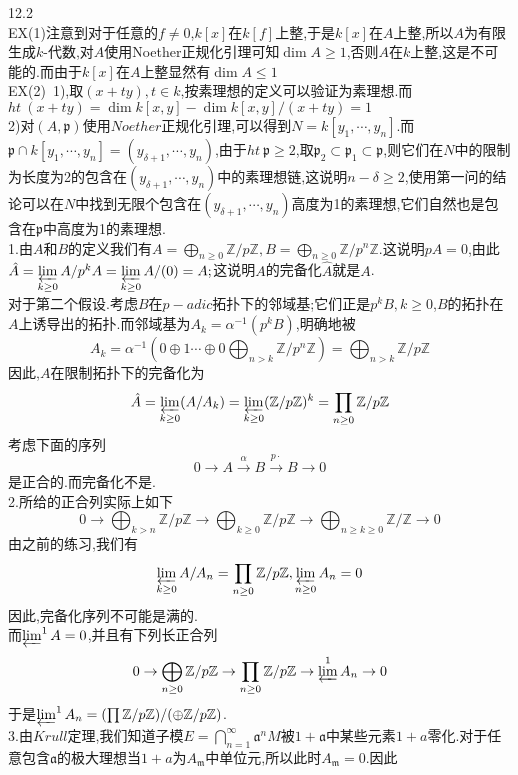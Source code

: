 \documentclass[b5paper]{ctexart}
\begin{document}
\pagestyle{plain}
\noindent
{}
12.2\\
EX(1)注意到对于任意的$f\neq 0$,$k[x]$在$k[f]$上整,于是$k[x]$在$A$上整,所以$A$为有限生成$k$-代数,对$A$使用Noether正规化引理可知$\dim A\geq 1$,否则$A$在$k$上整,这是不可能的.而由于$k[x]$在$A$上整显然有$\dim A\leq 1$\\
EX(2)~1),取$(x+ty),t\in k$,按素理想的定义可以验证为素理想.而$ht~(x+ty)=\dim k[x,y]-\dim k[x,y]/(x+ty)=1$\\
2)对$(A,\mathfrak{p})$使用$Noether$正规化引理,可以得到$N=k[y_1,\cdots,y_n]$.而$\mathfrak{p}\cap k[y_1,\cdots,y_n]=(y_{\delta+1},\cdots,y_n)$,由于$ht~\mathfrak{p}\geq 2$,取$\mathfrak{p_2}\subset \mathfrak{p_1}\subset \mathfrak{p}$,则它们在$N$中的限制为长度为2的包含在$(y_{\delta+1},\cdots,y_n)$中的素理想链,这说明$n-\delta\geq 2$,使用第一问的结论可以在$N$中找到无限个包含在$(y_{\delta+1},\cdots,y_n)$高度为1的素理想,它们自然也是包含在$\mathfrak{p}$中高度为1的素理想.\\
1.由$A$和$B$的定义我们有$A=\bigoplus\limits_{n\geq 0}\mathbb{Z}/p\mathbb{Z},B=\bigoplus\limits_{n\geq 0}\mathbb{Z}/p^n\mathbb{Z}$.这说明$pA=0$,由此$\hat{A}=\varprojlim\limits_{k\geq 0}A/p^kA=\varprojlim\limits_{k\geq 0}A/(0)=A;$这说明$A$的完备化$\hat{A}$就是$A$.\\
对于第二个假设.考虑$B$在$p-adic$拓扑下的邻域基;它们正是$p^kB,k\geq 0$,$B$的拓扑在$A$上诱导出的拓扑.而邻域基为$A_k=\alpha^{-1}(p^kB)$,明确地被
\[A_k=\alpha^{-1}(0\oplus1\cdots\oplus 0\bigoplus_{n>k}\mathbb{Z}/p^n\mathbb{Z})=\bigoplus_{n>k}\mathbb{Z}/p\mathbb{Z}\]
因此,$A$在限制拓扑下的完备化为
\[\hat{A}=\varprojlim_{k\geq 0}(A/A_k)=\varprojlim_{k\geq 0}(\mathbb{Z}/p\mathbb{Z})^k=\prod_{n\geq 0}\mathbb{Z}/p\mathbb{Z}\]
考虑下面的序列
\[0\to A\xrightarrow{\alpha}B\xrightarrow{p\cdot}B\to 0\]
是正合的.而完备化不是.\\
2.所给的正合列实际上如下
\[0\to \bigoplus_{k>n}\mathbb{Z}/p\mathbb{Z}\to \bigoplus_{k\geq 0}\mathbb{Z}/p\mathbb{Z}\to \bigoplus_{n\geq k\geq 0}\mathbb{Z}/\mathbb{Z}\to 0\]
由之前的练习,我们有
\[\varprojlim_{k\geq 0}A/A_n=\prod_{n\geq 0}\mathbb{Z}/p\mathbb{Z},\varprojlim_{n\geq 0}A_n=0\]
因此,完备化序列不可能是满的.\\
而$\varprojlim^1A=0$,并且有下列长正合列
\[0\to \bigoplus_{n\geq 0}\mathbb{Z}/p\mathbb{Z}\to\prod_{n\geq 0}\mathbb{Z}/p\mathbb{Z}\to\varprojlim^1A_n\to 0\]
于是$\varprojlim^1A_n=(\prod\mathbb{Z}/p\mathbb{Z})/(\oplus\mathbb{Z}/p\mathbb{Z})$.\\
3.由$Krull$定理,我们知道子模$E=\bigcap\limits_{n=1}^{\infty}\mathfrak{a}^nM$被$1+\mathfrak{a}$中某些元素$1+a$零化.对于任意包含$\mathfrak{a}$的极大理想当$1+a$为$A_{\mathfrak{m}}$中单位元,所以此时$A_{\mathfrak{m}}=0$.因此
\end{document}
